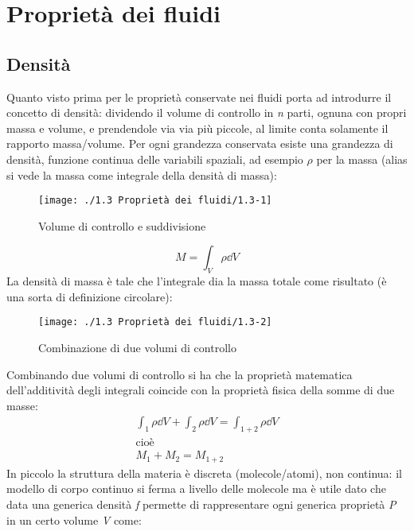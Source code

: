 %
\section{Proprietà dei fluidi}
\subsection{Densità}
Quanto visto prima per le proprietà conservate nei fluidi porta ad introdurre il concetto di densità: dividendo il volume di controllo in \textit{n} parti, ognuna con propri massa e volume, e prendendole via via più piccole, al limite conta solamente il rapporto massa/volume.
Per ogni grandezza conservata esiste una grandezza di densità, funzione continua delle variabili spaziali, ad esempio $\rho$ per la massa (alias si vede la massa come integrale della densità di massa):
	\begin{figure}[H]
		\texttt{[image: ./1.3 Proprietà dei fluidi/1.3-1]}
		\centering
		\caption{Volume di controllo e suddivisione}
	\end{figure}
%
	\begin{equation*}
		M = \int_V {\rho \dd{V}}
	\end{equation*}
%
La densità di massa è tale che l'integrale dia la massa totale come risultato (è una sorta di definizione circolare):
%
	\begin{figure}[H]
		\texttt{[image: ./1.3 Proprietà dei fluidi/1.3-2]}
		\centering
		\caption{Combinazione di due volumi di controllo}
	\end{figure}
%
Combinando due volumi di controllo si ha che la proprietà matematica dell'additività degli integrali coincide con la proprietà fisica della somme di due masse:
%
	\begin{equation*}
		\begin{gathered}
			\int_1 {\rho \dd{V}} + \int_2{\rho \dd{V}} = \int_{1+2}{\rho \dd{V}} \\
			\text{cioè} \\
			M_1 + M_2 = M_{1+2}
		\end{gathered}
	\end{equation*}
%
In piccolo la struttura della materia è discreta (molecole/atomi), non continua: il modello di corpo continuo si ferma a livello delle molecole ma è utile dato che data una generica densità \textit{f} permette di rappresentare ogni generica proprietà \textit{P} in un certo volume \textit{V} come:
